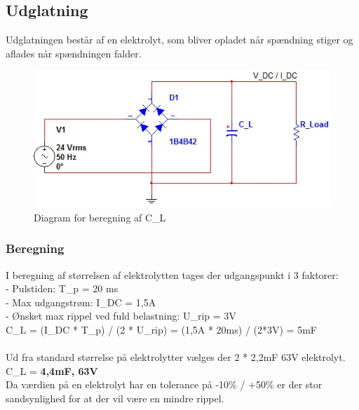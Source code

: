 \subsection{Udglatning}
Udglatningen består af en elektrolyt, som bliver opladet når spændning stiger og aflades når spændningen falder.
\begin{figure}[H]
\centering
\includegraphics[scale=0.7]{billeder/Udglatning}
\caption{Diagram for beregning af C\_L}
\label{fig:Udglatning}
\end{figure}
\subsubsection{Beregning} 
I beregning af størrelsen af elektrolytten tages der udgangspunkt i 3 faktorer:\\
- Pulstiden: T\_p = 20 ms\\
- Max udgangstrøm: I\_DC = 1,5A \\
- Ønsket max rippel ved fuld belastning: U\_rip = 3V\\
C\_L = (I\_DC * T\_p) / (2 * U\_rip) = (1,5A * 20ms) / (2*3V) = 5mF\\ \\
Ud fra standard størrelse på elektrolytter vælges der 2 * 2,2mF 63V elektrolyt. \\
C\_L = \textbf{4,4mF, 63V}\\
Da værdien på en elektrolyt har en tolerance på -10\% / +50\% er der stor sandsynlighed for at der vil være en mindre rippel.
\newpage
